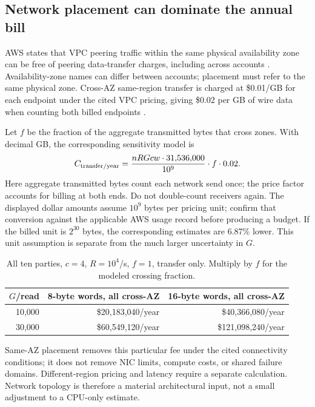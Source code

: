 \documentclass[11pt]{article}
\begin{document}
\subsection{Network placement can dominate the annual bill}

AWS states that VPC peering traffic within the same physical availability zone
can be free of peering data-transfer charges, including across accounts
\cite{awspeering}. Availability-zone names can differ between accounts; placement
must refer to the same physical zone. Cross-AZ same-region transfer is charged
at \$0.01/GB for each endpoint under the cited VPC pricing, giving \$0.02 per GB
of wire data when counting both billed endpoints \cite{awsvpc}.

Let $f$ be the fraction of the aggregate transmitted bytes that cross zones.
With decimal GB, the corresponding sensitivity model is
\begin{equation}
C_{\rm transfer/year}
=\frac{nRGcw\cdot31{,}536{,}000}{10^9}
\cdot f\cdot0.02.
\label{eq:transfer-cost}
\end{equation}
Here aggregate transmitted bytes count each network send once; the price factor
accounts for billing at both ends. Do not double-count receivers again.
The displayed dollar amounts assume $10^9$ bytes per pricing unit; confirm that
conversion against the applicable AWS usage record before producing a budget.
If the billed unit is $2^{30}$ bytes, the corresponding estimates are 6.87\%
lower. This unit assumption is separate from the much larger uncertainty in $G$.

\begin{table}[htbp]
\centering
\begin{tabular}{@{}rrr@{}}
\toprule
$G$/read & 8-byte words, all cross-AZ & 16-byte words, all cross-AZ \\
\midrule
10,000 & \$20,183,040/year & \$40,366,080/year \\
30,000 & \$60,549,120/year & \$121,098,240/year \\
\bottomrule
\end{tabular}
\caption{All ten parties, $c=4$, $R=10^4$/s, $f=1$, transfer only. Multiply by
$f$ for the modeled crossing fraction.}
\end{table}

Same-AZ placement removes this particular fee under the cited connectivity
conditions; it does not remove NIC limits, compute costs, or shared failure
domains. Different-region pricing and latency require a separate calculation.
Network topology is therefore a material architectural input, not a small
adjustment to a CPU-only estimate.
\end{document}
